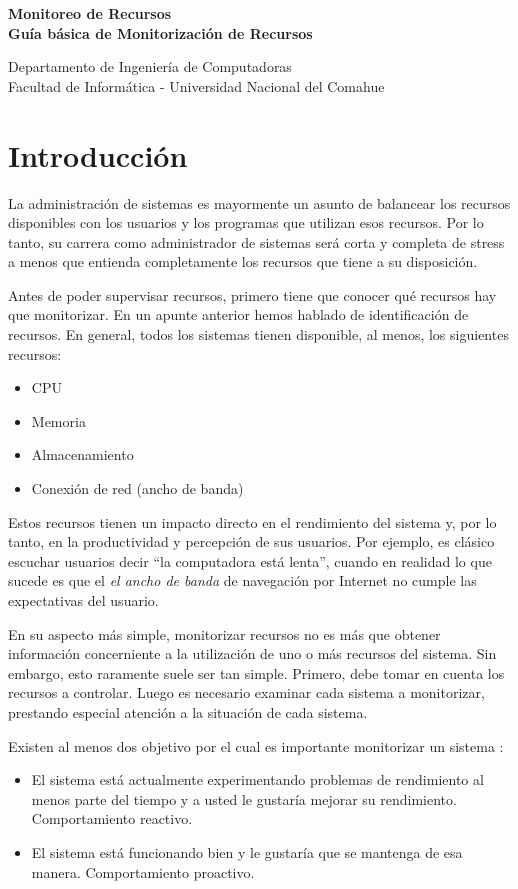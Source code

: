 \documentclass[12pt]{article}
\def\maketitle{

 \makeatletter
 {\color{bl} \centering \huge \sc \textbf{
 Monitoreo de Recursos \\ 
\large \vspace*{-8pt} \color{black} Guía básica de Monitorización de Recursos 
 \vspace*{8pt} }\par}
 \makeatother


 \makeatletter
 {\centering \small 
 	Departamento de Ingeniería de Computadoras \\
 	Facultad de Informática - Universidad Nacional del Comahue \\
 	\vspace{20pt} }
 \makeatother

}
\begin{document}
\thispagestyle{empty}
\maketitle
\setlength{\parindent}{0pt}

\section*{Introducción}

La administración de sistemas es mayormente un asunto de balancear los 
recursos disponibles con los usuarios y los programas que utilizan esos 
recursos. Por lo tanto, su carrera como administrador de sistemas será 
corta y completa de stress a menos que entienda completamente los recursos 
que tiene a su disposición.

Antes de poder supervisar recursos, primero tiene que conocer qué recursos 
hay que monitorizar. En un apunte anterior hemos hablado de identificación 
de recursos. En general, todos los sistemas tienen disponible, al menos, los 
siguientes recursos:

\begin{itemize}
\item CPU
\item Memoria
\item Almacenamiento
\item Conexión de red (ancho de banda)
\end{itemize}

Estos recursos tienen un impacto directo en el rendimiento del sistema y, 
por lo tanto, en la productividad y percepción de sus usuarios. Por ejemplo,
es clásico escuchar usuarios decir ``la computadora está lenta'', cuando 
en realidad lo que sucede es que el \textit{el ancho de banda} de
navegación por Internet no cumple las expectativas del usuario. 

En su aspecto más simple, monitorizar recursos no es más que obtener 
información concerniente a la utilización de uno o más recursos del sistema.
Sin embargo, esto raramente suele ser tan simple. Primero, debe tomar en 
cuenta los recursos a controlar. Luego es necesario examinar cada sistema 
a monitorizar, prestando especial atención a la situación de cada sistema.

Existen al menos dos objetivo por el cual es importante monitorizar un
sistema :

\begin{itemize}
\item El sistema está actualmente experimentando problemas de rendimiento
al menos parte del tiempo y a usted le gustaría mejorar su rendimiento. 
Comportamiento reactivo. 

\item El sistema está funcionando bien y le gustaría que se mantenga de esa 
manera. Comportamiento proactivo. 
\end{itemize}
\end{document}

